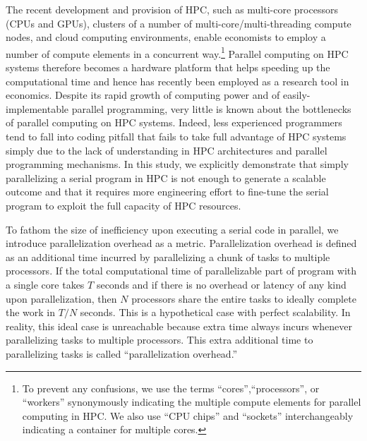 \documentclass[12pt]{article}
\begin{document}
The recent development and provision of HPC, such as multi-core processors (CPUs and GPUs), clusters of a number of multi-core/multi-threading compute nodes, and cloud computing environments, enable economists to employ a number of compute elements in a concurrent way.\footnote{\sf To prevent any confusions, we use the terms ``cores'',``processors'', or ``workers'' synonymously indicating the multiple compute elements for parallel computing in HPC. We also use ``CPU chips'' and ``sockets'' interchangeably indicating a container for multiple cores.} Parallel computing on HPC systems therefore becomes a hardware platform that helps speeding up the computational time and hence has recently been employed as a research tool in economics. Despite its rapid growth of computing power and of easily-implementable parallel programming, very little is known about the bottlenecks of parallel computing on HPC systems. Indeed, less experienced programmers tend to fall into coding pitfall that fails to take full advantage of HPC systems simply due to the lack of understanding in HPC architectures and parallel programming mechanisms. In this study, we explicitly demonstrate that simply parallelizing a serial program in HPC is not enough to generate a scalable outcome and that it requires more engineering effort to fine-tune the serial program to exploit the full capacity of HPC resources.

To fathom the size of inefficiency upon executing a serial code in parallel, we introduce parallelization overhead as a metric. Parallelization overhead is defined as an additional time incurred by parallelizing a chunk of tasks to multiple processors. If the total computational time of parallelizable part of program with a single core takes $T$ seconds and if there is no overhead or latency of any kind upon parallelization, then $N$ processors share the entire tasks to ideally complete the work in $T/N$ seconds. This is a hypothetical case with perfect scalability. In reality, this ideal case is unreachable because extra time always incurs whenever parallelizing tasks to multiple processors. This extra additional time to parallelizing tasks is called ``parallelization overhead.''
\end{document}
